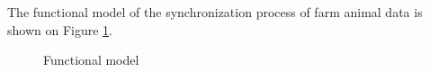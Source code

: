 The functional model of the synchronization process of farm animal
data is shown on Figure \ref{cap:Functional-model}. %
\begin{figure}

\caption{Functional model\label{cap:Functional-model}}

\end{figure}

